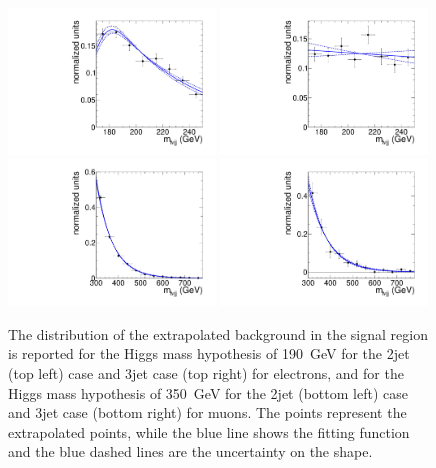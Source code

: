 \begin{figure}[!t]
  \centering
    \includegraphics[width=0.49\textwidth]{plots/2012_WJetsShape/H190_Mlvjj_Electron_2jets_WpJShape.pdf}
    \includegraphics[width=0.49\textwidth]{plots/2012_WJetsShape/H190_Mlvjj_Electron_3jets_WpJShape.pdf}
    \includegraphics[width=0.49\textwidth]{plots/2012_WJetsShape/H350_Mlvjj_Muon_2jets_WpJShape.pdf}
    \includegraphics[width=0.49\textwidth]{plots/2012_WJetsShape/H350_Mlvjj_Muon_3jets_WpJShape.pdf}
  \caption{\label{fig:Wjets_dd_example}
       The distribution of the extrapolated background in the signal region
       is reported for the Higgs mass hypothesis of 190~GeV for the 2jet (top left) case and 3jet case (top right) for electrons,
       and for the Higgs mass hypothesis of 350~GeV for the 2jet (bottom left) case and 3jet case (bottom right) for muons.
       The points represent the extrapolated points, 
       while the blue line shows the fitting function and the blue dashed lines are the uncertainty on the shape.
    } 
\end{figure}

